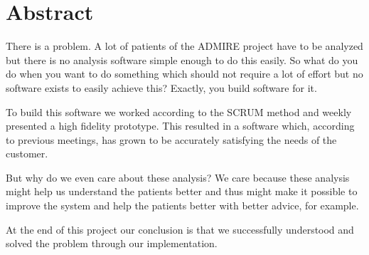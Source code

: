 \chapter*{Abstract}

There is a problem. A lot of patients of the ADMIRE project have to be analyzed but there is no analysis software simple enough to do this easily. So what do you do when you want to do something which should not require a lot of effort but no software exists to easily achieve this? Exactly, you build software for it.

To build this software we worked according to the SCRUM method and weekly presented a high fidelity prototype. This resulted in a software which, according to previous meetings, has grown to be accurately satisfying the needs of the customer. %

But why do we even care about these analysis? We care because these analysis might help us understand the patients better and thus might make it possible to improve the system and help the patients better with better advice, for example.

At the end of this project our conclusion is that we successfully understood and solved the problem through our implementation.

